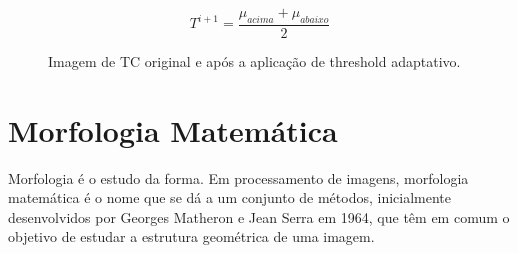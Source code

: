 \begin{equation}
 T^{i+1} = \frac{\mu_{acima}+\mu_{abaixo}}{2}
 \label{equa:thresholdAdaptativo}
\end{equation}

\begin{figure}[ht]
 \begin{center}
 \end{center}
 \caption{Imagem de TC original e após a aplicação de threshold adaptativo.}
 \label{fig:threshold}
\end{figure}

\section{Morfologia Matemática}

Morfologia é o estudo da forma. Em processamento de imagens, morfologia matemática é o nome que se dá a um conjunto de métodos, inicialmente desenvolvidos por Georges Matheron e Jean Serra  em 1964, que têm em comum o objetivo de estudar a estrutura geométrica de uma imagem.


